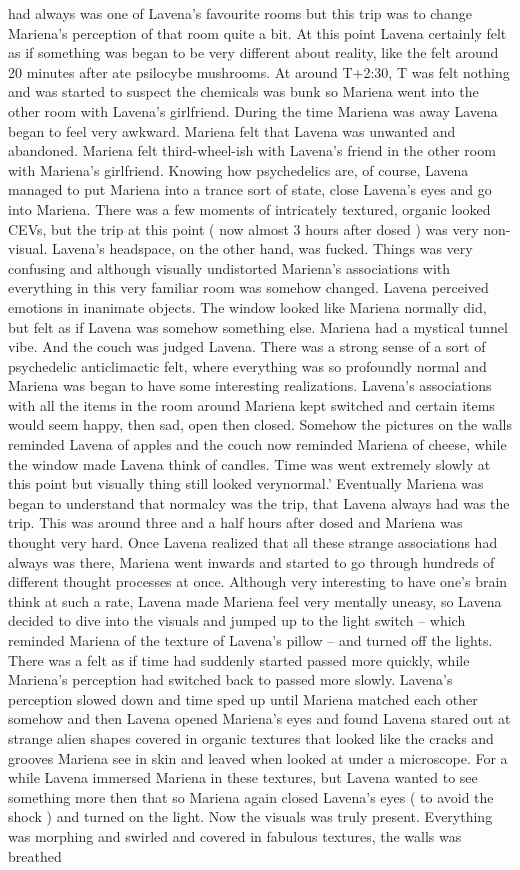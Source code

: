 \documentclass[12pt]{book}
\begin{document}
had always was one of Lavena's favourite rooms but this trip was to change Mariena's perception of that room quite a bit. At this point Lavena certainly felt as if something was began to be very different about reality, like the felt around 20 minutes after ate psilocybe mushrooms. At around T+2:30, T was felt nothing and was started to suspect the chemicals was bunk so Mariena went into the other room with Lavena's girlfriend. During the time Mariena was away Lavena began to feel very awkward. Mariena felt that Lavena was unwanted and abandoned. Mariena felt third-wheel-ish with Lavena's friend in the other room with Mariena's girlfriend. Knowing how psychedelics are, of course, Lavena managed to put Mariena into a trance sort of state, close Lavena's eyes and go into Mariena. There was a few moments of intricately textured, organic looked CEVs, but the trip at this point ( now almost 3 hours after dosed ) was very non-visual. Lavena's headspace, on the other hand, was fucked. Things was very confusing and although visually undistorted Mariena's associations with everything in this very familiar room was somehow changed. Lavena perceived emotions in inanimate objects. The window looked like Mariena normally did, but felt as if Lavena was somehow something else. Mariena had a mystical tunnel vibe. And the couch was judged Lavena. There was a strong sense of a sort of psychedelic anticlimactic felt, where everything was so profoundly normal and Mariena was began to have some interesting realizations. Lavena's associations with all the items in the room around Mariena kept switched and certain items would seem happy, then sad, open then closed. Somehow the pictures on the walls reminded Lavena of apples and the couch now reminded Mariena of cheese, while the window made Lavena think of candles. Time was went extremely slowly at this point but visually thing still looked verynormal.' Eventually Mariena was began to understand that normalcy was the trip, that Lavena always had was the trip. This was around three and a half hours after dosed and Mariena was thought very hard. Once Lavena realized that all these strange associations had always was there, Mariena went inwards and started to go through hundreds of different thought processes at once. Although very interesting to have one's brain think at such a rate, Lavena made Mariena feel very mentally uneasy, so Lavena decided to dive into the visuals and jumped up to the light switch -- which reminded Mariena of the texture of Lavena's pillow -- and turned off the lights. There was a felt as if time had suddenly started passed more quickly, while Mariena's perception had switched back to passed more slowly. Lavena's perception slowed down and time sped up until Mariena matched each other somehow and then Lavena opened Mariena's eyes and found Lavena stared out at strange alien shapes covered in organic textures that looked like the cracks and grooves Mariena see in skin and leaved when looked at under a microscope. For a while Lavena immersed Mariena in these textures, but Lavena wanted to see something more then that so Mariena again closed Lavena's eyes ( to avoid the shock ) and turned on the light. Now the visuals was truly present. Everything was morphing and swirled and covered in fabulous textures, the walls was breathed 
\end{document}
